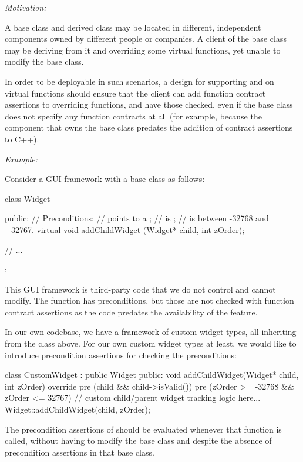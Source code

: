 \emph{Motivation:}

A base class and derived class may be located in different, independent components owned by different people or companies. A client of the base class may be deriving from it and overriding some virtual functions, yet unable to modify the base class.

In order to be deployable in such scenarios, a design for supporting  and  on virtual functions should ensure that the client can add function contract assertions to overriding functions, and have those checked, even if the base class does not specify any function contracts at all (for example, because the component that owns the base class predates the addition of contract assertions to C++).


\emph{Example:}

Consider a GUI framework with a  base class as follows:

\begin{codeblock}
class Widget {
public:
  // Preconditions:   
  // \phantom{xxx} points to a ;
  // \phantom{xxx} is ; 
  // \phantom{xxx} is between -32768 and +32767.
  virtual void addChildWidget (Widget* child, int zOrder);
  
// ...
};
\end{codeblock}
This GUI framework is third-party code that we do not control and cannot modify. The function \allowbreak{} has preconditions, but those are not checked with function contract assertions as the code predates the availability of the feature.

In our own codebase, we have a framework of custom widget types, all inheriting from the  class above. For our own custom widget types at least, we would like to introduce precondition assertions for checking the preconditions:
\begin{codeblock}
class CustomWidget : public Widget {
public:
  void addChildWidget(Widget* child, int zOrder) override
    pre (child && child->isValid())
    pre (zOrder >= -32768 && zOrder <= 32767) 
  {
    // custom child/parent widget tracking logic here...
    Widget::addChildWidget(child, zOrder);
  }
}
\end{codeblock}

The precondition assertions of \allowbreak{} should be evaluated whenever that function is called, without having to modify the  base class and despite the absence of precondition assertions in that base class.

